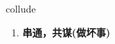 
\begin{frame}
{\huge collude}
\begin{center}
\begin{enumerate}\Large
  \item \textbf{串通，共谋(做坏事)}
\end{enumerate}
\end{center}
\end{frame}
